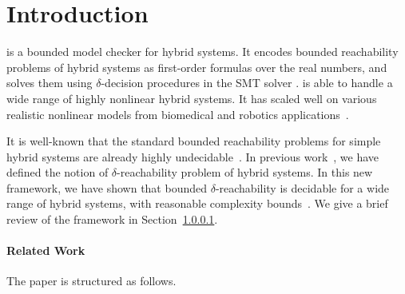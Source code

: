 \section{Introduction}

\dReach{} is a bounded model checker for hybrid systems. It encodes bounded reachability problems of hybrid systems as first-order formulas over the real numbers, and solves them using $\delta$-decision procedures in the SMT solver \dReal{}. \dReach{} is able to handle a wide range of highly nonlinear hybrid systems. It has scaled well on various realistic nonlinear models from biomedical and robotics applications~\cite{}.

It is well-known that the standard bounded reachability problems for simple hybrid systems are already highly undecidable~\cite{DBLP:conf/rex/AlurD91,DBLP:conf/hybrid/AlurCHH92}. In previous work~\cite{}, we have defined the notion of $\delta$-reachability problem of hybrid systems. In this new framework, we have shown that bounded $\delta$-reachability is decidable for a wide range of hybrid systems, with reasonable complexity bounds~\cite{}. We give a brief review of the framework in Section~\ref{}.

\paragraph{Related Work}

The paper is structured as follows.


